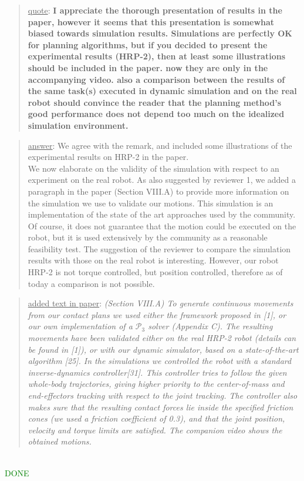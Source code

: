 \documentclass[a4paper]{article}
\newcommand{\done}[0]{\textcolor{green}{DONE}}
\newcommand\quot[1]{\begin{quote} \underline{quote}: \textbf{#1}\end{quote}}
\newcommand\as[1]{\begin{quote} \underline{answer}: {#1}\end{quote} }
\newcommand\qt[1]{\begin{quote} \underline{added text in paper}: \textit{#1}\end{quote} \leavevmode \\ }
\begin{document}
\quot{I appreciate the thorough presentation of results in the paper, however
it seems that this presentation is somewhat biased towards simulation
results. Simulations are perfectly OK for planning algorithms, but if
you decided to present the experimental results (HRP-2), then at least some
illustrations should be included in the paper. now they are only in the
accompanying video.  also a comparison between the results of the same
task(s) executed in dynamic simulation and on the real robot should
convince the reader that the planning method's good performance does
not depend too much on the idealized simulation environment. }
\as{We agree with the remark, and included some illustrations of the experimental results on HRP-2 in the paper. \\
We now elaborate on the validity of the simulation with respect to an experiment on the real robot. As also suggested by reviewer 1, we added a paragraph
in the paper (Section VIII.A)  to provide more information on the simulation we use to validate our motions. This simulation is an implementation of the state of the art approaches used by the community. Of course, it does not guarantee that the motion could be executed on the robot, but it is used extensively by the community as a reasonable feasibility test. The suggestion of the reviewer to compare the simulation results with those on the real robot is interesting. However, our robot HRP-2 is not torque controlled, but position controlled, therefore as of today a comparison is not possible.}
\qt{(Section VIII.A) To generate continuous movements from our contact plans we used either the framework proposed in [1], or our own implementation of a $\mathcal{P}_3$ solver (Appendix C).
The resulting movements have been validated either on the real HRP-2 robot (details can be found in [1]), or with our dynamic simulator, based on a state-of-the-art algorithm [25].
In the simulations we controlled the robot with a standard inverse-dynamics controller[31].
This controller tries to follow the given whole-body trajectories, giving higher priority to the center-of-mass and end-effectors tracking with respect to the joint tracking.
The controller also makes sure that the resulting contact forces lie inside the specified friction cones (we used a friction coefficient of 0.3), and that the joint position, velocity and torque limits are satisfied.
The companion video shows the obtained motions.}
\done
\end{document}
